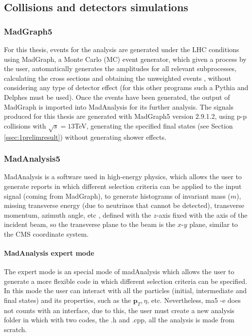 \subsection{Collisions and detectors simulations} \label{ssec:simulations}

\subsubsection{MadGraph5} \label{ssec:madgraph}

For this thesis, events for the analysis are generated under the LHC conditions using MadGraph, a Monte Carlo (MC) event generator, which given a process by the user, automatically generates the amplitudes for all relevant subprocesses, calculating the cross sections and obtaining the unweighted events \cite{Maltoni}, without considering any type of detector effect (for this other programs such a Pythia and Delphes must be used). Once the events have been generated, the output of MadGraph is imported into MadAnalysis for its further analysis. The signals produced for this thesis are generated with MadGraph5 version 2.9.1.2, using p-p collisions with $\sqrt{s} = 13$TeV, generating the specified final states (see Section \ref{ssec:1prelimresult}) without generating shower effects.

\subsubsection{MadAnalysis5} \label{ssec:madanalysis}

MadAnalysis is a software used in high-energy physics, which allows the user to generate reports in which different selection criteria can be applied to the input signal (coming from MadGraph), to generate histograms of invariant mass ($m$), missing transverse energy (due to neutrinos that cannot be detected), transverse momentum, azimuth angle, etc \cite{Fuks}, defined with the $z$-axis fixed with the axis of the incident beam, so the transverse plane to the beam is the $x$-$y$ plane, similar to the CMS coordinate system.

\paragraph{MadAnalysis expert mode} \label{ssec:expertmode}

The expert mode is an special mode of madAnalysis which allows the user to generate a more flexible code in which different selection criteria can be specified. In this mode the user can interact with all the particles (initial, intermediate and final states) and its properties, such as the $\bm{p}_T, \eta$, etc. Nevertheless, ma5 -e does not counts with an interface, due to this, the user must create a new analysis folder in which with two codes, the .h and .cpp, all the analysis is made from scratch.

